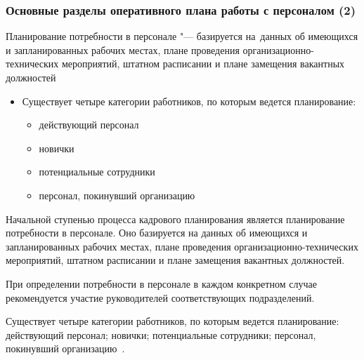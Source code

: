 \documentclass{../industrial-development}
\begin{document}
	\begin{frame} \frametitle{Основные разделы оперативного плана работы с персоналом (2)}
		\alert{Планирование потребности в персонале} "--- базируется на~данных об имеющихся и запланированных рабочих местах, плане проведения организационно-технических мероприятий, штатном расписании и плане замещения вакантных должностей
		\begin{itemize}
			\item Существует четыре категории работников, по которым ведется планирование:
			\begin{itemize}
				\item	действующий персонал
				\item	новички
				\item	потенциальные сотрудники
				\item	персонал, покинувший организацию
			\end{itemize}
		\end{itemize}
	\end{frame}
	
	\lecturenotes
	
	Начальной ступенью процесса кадрового планирования является планирование потребности в персонале. Оно базируется на данных об имеющихся и запланированных рабочих местах, плане проведения организационно-технических мероприятий, штатном расписании и плане замещения вакантных должностей.
	
	При определении потребности в персонале в каждом конкретном случае рекомендуется участие руководителей соответствующих подразделений.
	
	Существует четыре категории работников, по которым ведется планирование: действующий персонал; новички; потенциальные сотрудники; персонал, покинувший организацию~\cite[с.~88]{Ivanova}.
	
\end{document}
